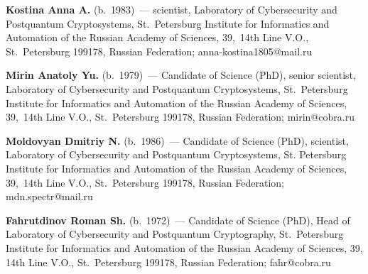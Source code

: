   \noindent
  \textbf{Kostina Anna A.} (b.\ 1983)~--- scientist, Laboratory of Cybersecurity 
and Postquantum Cryptosystems, St.\ Petersburg Institute for Informatics and 
Automation of the Russian Academy of Sciences, 39,~14th Line V.O., St.\ 
Petersburg 199178, Russian Federation; \mbox{anna-kostina1805@mail.ru}
  
  \vspace*{3pt}
  
  \noindent
  \textbf{Mirin Anatoly Yu.} (b.\ 1979)~--- Candidate of Science (PhD), senior 
scientist, Laboratory of  Cybersecurity and Postquantum Cryptosystems, 
  St.\ Petersburg Institute for Informatics and Automation of the Russian Academy 
of Sciences, 39,~14th Line V.O., St.\ Petersburg 199178, Russian Federation; 
\mbox{mirin@cobra.ru}
  
  \vspace*{3pt}
  
  \noindent
  \textbf{Moldovyan Dmitriy N.} (b.\ 1986)~--- Candidate of Science (PhD), 
scientist, Laboratory of  Cybersecurity and Postquantum Cryptosystems, St. 
Petersburg Institute for Informatics and Automation of the Russian Academy of 
Sciences, 
  39,~14th Line V.O., St.\ Petersburg 199178, Russian Federation; 
\mbox{mdn.spectr@mail.ru}
  \vspace*{3pt}
  
  \noindent
  \textbf{Fahrutdinov Roman Sh.} (b.\ 1972)~--- Candidate of Science (PhD), 
Head of Laboratory of Cybersecurity and Postquantum Cryptography, St.\ Petersburg 
Institute for Informatics and Automation of the Russian Academy of Sciences, 
  39, 14th Line V.O., St.\ Petersburg 199178, Russian Federation; 
\mbox{fahr@cobra.ru}
  



\label{end\stat}

\renewcommand{\bibname}{\protect\rm Литература} 
  